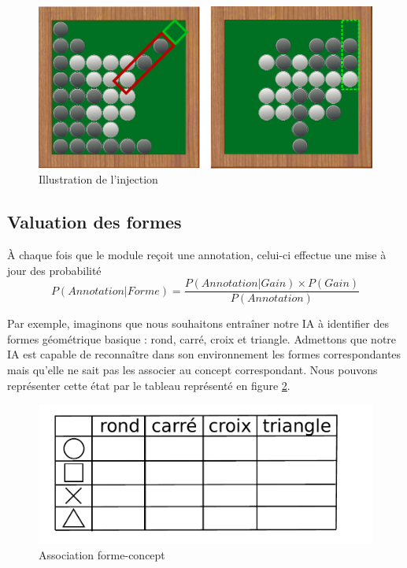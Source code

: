 \begin{figure}[H] 
\includegraphics[width=\textwidth]{files/raisonneur/cbs_reco3} 
\caption{Illustration de l'injection} 
\label{cbs_reco3}
\end{figure}

\subsection{Valuation des formes}

À chaque fois que le module reçoit une annotation, celui-ci effectue une mise à jour des probabilité
\[ P(Annotation|Forme) = \frac{P(Annotation|Gain) \times P(Gain)}{P(Annotation)} \]

Par exemple, imaginons que nous souhaitons entraîner notre IA à identifier des formes géométrique basique : rond, carré, croix et triangle. Admettons que notre IA est capable de reconnaître dans son environnement les formes correspondantes mais qu'elle ne sait pas les associer au concept correspondant. Nous pouvons représenter cette état par le tableau représenté en figure \ref{img_annotations}.

\begin{figure}[H] 
\includegraphics[width=\textwidth]{files/raisonneur/annotations} 
\caption{Association forme-concept} 
\label{img_annotations}
\end{figure}

